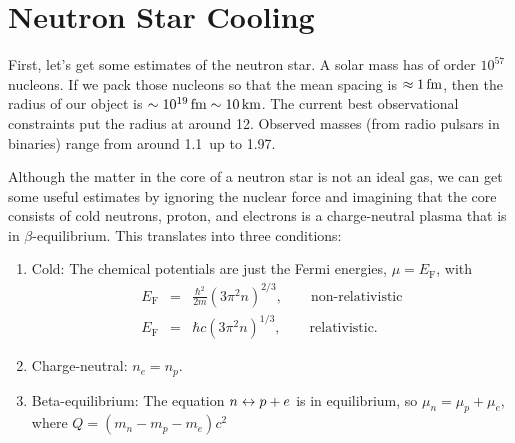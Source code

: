 \chapter{Neutron Star Cooling}

First, let's get some estimates of the neutron star.  A solar mass has of order $10^{57}$ nucleons.  If we pack those nucleons so that the mean spacing is $\approx 1\,\mathrm{fm}$, then the radius of our object is $\sim 10^{19}\,\mathrm{fm}\sim 10\,\mathrm{k}\mathrm{m}$.  The current best observational constraints put the radius at around 12\nsp\km.  Observed masses (from radio pulsars in binaries) range from around 1.1\nsp\Msun\ up to 1.97\nsp\Msun.

Although the matter in the core of a neutron star is not an ideal gas, we can get some useful estimates by ignoring the nuclear force and imagining that the core consists of cold  neutrons, proton, and electrons is a charge-neutral plasma that is in $\beta$-equilibrium. This translates into three conditions:
\begin{enumerate}
\item Cold: The chemical potentials are just the Fermi energies, $\mu = E_{\mathrm{F}}$, with
\begin{eqnarray}
	E_{\mathrm{F}} &=& \frac{\hbar^{2}}{2m}\left(3\pi^{2}n\right)^{2/3},\qquad\textrm{non-relativistic}\\
	E_{\mathrm{F}} &=& \hbar c\left(3\pi^{2}n\right)^{1/3},\qquad\textrm{relativistic}.
\end{eqnarray}
\item Charge-neutral: $n_{e} = n_{p}$.
\item Beta-equilibrium: The equation $n\leftrightarrow p+e$ is in equilibrium, so 
$ \mu_{n} = \mu_{p}+\mu_{e}$,
where $Q = (m_{n}-m_{p}-m_{e})c^{2}$
\end{enumerate}

